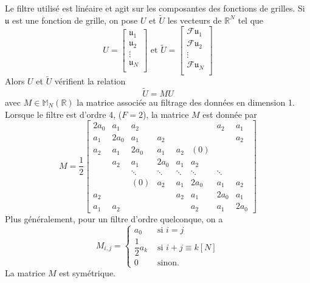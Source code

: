 Le filtre utilisé est linéaire et agit sur les composantes des fonctions de grilles. Si $\mathfrak{u}$ est une fonction de grille, on pose $U$ et $\tilde{U}$ les vecteurs de $\mathbb{R}^N$ tel que
\begin{equation}
U = \begin{bmatrix}
\mathfrak{u}_1\\
\mathfrak{u}_2\\
\vdots \\
\mathfrak{u}_N\\
\end{bmatrix} \text{ et } 
\tilde{U} = \begin{bmatrix}
\mathcal{F}\mathfrak{u}_1\\
\mathcal{F}\mathfrak{u}_2\\
\vdots \\
\mathcal{F}\mathfrak{u}_N\\
\end{bmatrix}
\end{equation}
Alors $U$ et $\tilde{U}$ vérifient la relation
\begin{equation}
\tilde{U} = M U
\end{equation}
avec $M \in \mathbb{M}_N \left( \mathbb{R} \right)$ la matrice associée au filtrage des données en dimension 1. Lorsque le filtre est d'ordre 4, ($F=2$), la matrice $M$ est donnée par
\begin{equation}
M = \dfrac{1}{2}
\begin{bmatrix}
2a_0 & a_1 & a_2 &   &   &   & a_2 & a_1 \\ 
a_1 & 2 a_0 & a_1 & a_2 &   &   &   & a_2 \\ 
a_2 & a_1 & 2a_0 & a_1 & a_2 & (0) &   &   \\ 
  & a_2 & a_1 & 2a_0 & a_1 & a_2 &   &   \\ 
  &   & \ddots & \ddots & \ddots & \ddots & \ddots &   \\ 
  &   & (0) & a_2 & a_1 & 2 a_0 & a_1 & a_2 \\ 
a_2 &   &   &   & a_2 & a_1 & 2a_0 & a_1 \\ 
a_1 & a_2 &   &   &   & a_2 & a_1 & 2a_0
\end{bmatrix}
\end{equation}
Plus généralement, pour un filtre d'ordre quelconque, on a
\begin{equation}
M_{i,j} = \left\lbrace
\begin{array}{cl}
a_0 & \text{ si } i=j \\
\dfrac{1}{2} a_k & \text{ si } i+j \equiv k [N]\\
0 & \text{ sinon.}
\end{array}
\right.
\end{equation}
La matrice $M$ est symétrique.








